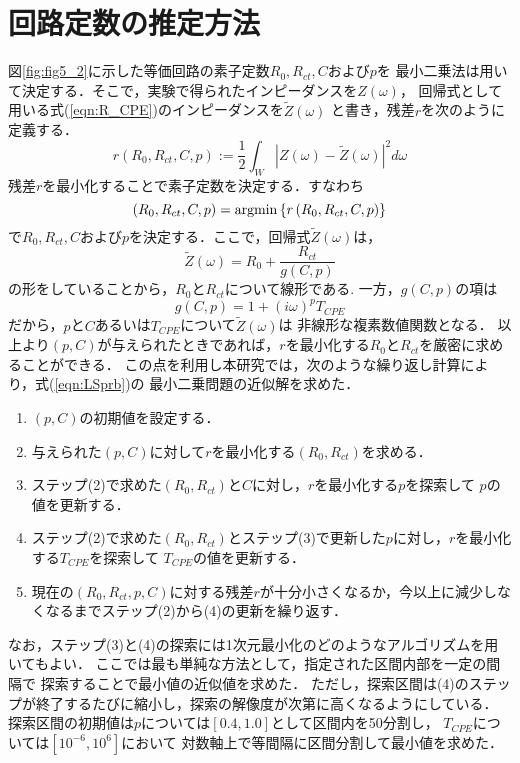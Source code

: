\section{回路定数の推定方法}
図\ref{fig:fig5_2}に示した等価回路の素子定数$R_0,R_{ct},C$および$p$を
最小二乗法は用いて決定する．そこで，実験で得られたインピーダンスを$Z(\omega)$，
回帰式として用いる式(\ref{eqn:R_CPE})のインピーダンスを$\tilde{Z}(\omega)$
と書き，残差$r$を次のように定義する．
\begin{equation}
	r\left(R_0,R_{ct},C,p \right):= \frac{1}{2}\int _{W} \left| Z(\omega)-\tilde{Z}(\omega)\right|^2 d\omega
	\label{eqn:}
\end{equation}
残差$r$を最小化することで素子定数を決定する．すなわち
\begin{equation}
	\left( R_0, R_{ct}, C,p \right)= {\rm argmin} \left\{ r\left(R_0,R_{ct},C,p \right) \right\}
	\label{eqn:LSprb}
\end{equation}
で$R_0,R_{ct},C$および$p$を決定する．ここで，回帰式$\tilde Z(\omega)$は，
\begin{equation}
	\tilde Z (\omega) =R_0+\frac{R_{ct}}{g(C,p)}
	\label{eqn:}
\end{equation}
の形をしていることから，$R_0$と$R_{ct}$について線形である. 一方，$g(C,p)$の項は
\begin{equation}
	g(C,p)= 1+(i\omega)^pT_{CPE} 
	\label{eqn:}
\end{equation}
だから，$p$と$C$あるいは$T_{CPE}$について$\tilde {Z}(\omega)$は
非線形な複素数値関数となる．
以上より$(p,C)$が与えられたときであれば，$r$を最小化する$R_0$と$R_{ct}$を厳密に求めることができる．
この点を利用し本研究では，次のような繰り返し計算により，式(\ref{eqn:LSprb})の
最小二乗問題の近似解を求めた．
\begin{enumerate}
\item
	$(p,C)$の初期値を設定する．
\item
	与えられた$(p,C)$に対して$r$を最小化する$(R_0, R_{ct})$を求める．
\item
	ステップ(2)で求めた$(R_0,R_{ct})$と$C$に対し，$r$を最小化する$p$を探索して
	$p$の値を更新する．
\item
	ステップ(2)で求めた$(R_0,R_{ct})$とステップ(3)で更新した$p$に対し，$r$を最小化する$T_{CPE}$を探索して
	$T_{CPE}$の値を更新する．
\item
	現在の$(R_0,R_{ct},p,C)$に対する残差$r$が十分小さくなるか，今以上に減少しなくなるまでステップ(2)から(4)の更新を繰り返す．
\end{enumerate}
なお，ステップ(3)と(4)の探索には1次元最小化のどのようなアルゴリズムを用いてもよい．
ここでは最も単純な方法として，指定された区間内部を一定の間隔で
探索することで最小値の近似値を求めた．
ただし，探索区間は(4)のステップが終了するたびに縮小し，探索の解像度が次第に高くなるようにしている．
探索区間の初期値は$p$については$[0.4,1.0]$として区間内を50分割し，
$T_{CPE}$については$ [10^{-6}, 10^{6}]$において
対数軸上で等間隔に区間分割して最小値を求めた．
